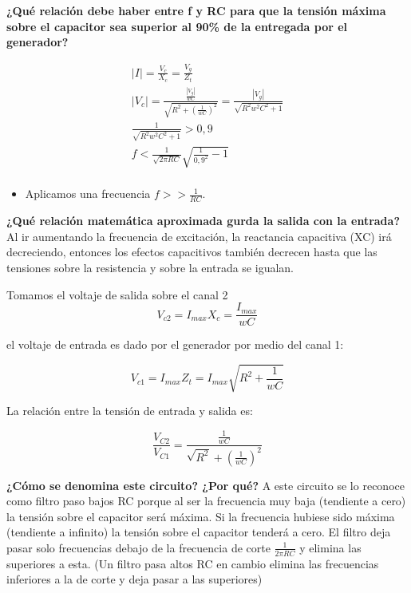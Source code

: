 \documentclass{article}
\begin{document}
\textbf{¿Qué relación debe haber entre f y RC para que la tensión máxima sobre el capacitor sea superior al 90\% de la entregada por el generador?}

\begin{align*}
|I| = \frac{V_c}{X_c} = \frac{V_g}{Z_t} \\
|V_c| = \frac{\frac{|V_g|}{wC}}{\sqrt{R^2+(\frac{1}{wC})^2}} = \frac{|V_g|}{\sqrt{R^2 w^2 C^2 +1}}\\
\frac{1}{\sqrt{R^2 w^2 C^2 +1}} > 0,9 \\
f < \frac{1}{\sqrt{2 \pi RC}} \sqrt{\frac{1}{0,9^2}-1} \\
\end{align*}

\begin{itemize}
\item  Aplicamos una frecuencia $f >> \frac{1}{RC}$.
\end{itemize}
\textbf{ ¿Qué relación matemática aproximada gurda la salida con la entrada?} Al ir aumentando la frecuencia de excitación, la reactancia capacitiva (XC) irá decreciendo, entonces los efectos capacitivos también decrecen hasta que las tensiones sobre la resistencia y sobre la entrada se igualan.

Tomamos el voltaje de salida sobre el canal 2 
\begin{equation}
V_{c2} = I_{max} X_c = \frac{I_{max}}{wC}
\end{equation}

el voltaje de entrada es dado por el generador por medio del canal 1: 

\begin{equation}
V_{c1} = I_{max} Z_t = I_{max}\sqrt{R^2 + \frac{1}{wC}}
\end{equation}

La relación entre la tensión de entrada y salida es:

\begin{equation}
\frac{V_{C2}}{V_{C1}} = \frac{\frac{1}{wC}}{\sqrt{R^{2}} + (\frac{1}{wC})^{2}}
\end{equation}

\textbf{¿Cómo se denomina este circuito? ¿Por qué?} 
A este circuito se lo reconoce como filtro paso bajos RC porque al ser la frecuencia muy baja (tendiente a cero) la tensión sobre el capacitor será máxima. Si la frecuencia hubiese sido máxima (tendiente a 
infinito) la tensión sobre el capacitor tenderá a cero. El filtro deja pasar solo frecuencias debajo de 
la frecuencia de corte $\frac{1}{2 \pi RC}$ y elimina las superiores a esta. (Un filtro pasa altos RC en cambio elimina las frecuencias inferiores a la de corte y deja pasar a las superiores) 
\end{document}
